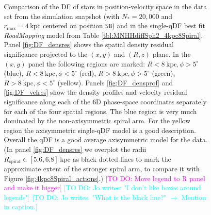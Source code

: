 \documentclass[iop,revtex4,numberedappendix,appendixfloats]{emulateapj}
\newcommand{\RM}{{\sl RoadMapping}}
\newcommand{\Wilma}[1]{\textcolor{Magenta}{#1}}
\newcommand{\Jo}[1]{\textcolor{Cyan}{#1}}
\begin{document}
\begin{figure}[!htbp]
  \caption{Comparison of the DF of stars in position-velocity space in the data set from the simulation snapshot (with $N_*=20,000$ and $r_\text{max}=4~\text{kpc}$ centered on position \texttt{S8}) and in the single-qDF best fit \RM{} model from Table \ref{tbl:MNHHdiffSph2_4kpc8Spiral}. Panel \ref{fig:DF_densres} shows the spatial density residual significance projected to the $(x,y)$ and $(R,z)$ plane. In the $(x,y)$ panel the following regions are marked: $R<8~\text{kpc},\phi>5^\circ$ (blue), $R<8~\text{kpc},\phi<5^\circ$ (red), $R>8~\text{kpc},\phi>5^\circ$ (green), $R>8~\text{kpc},\phi<5^\circ$ (yellow). Panels \ref{fig:DF_densprof} and \ref{fig:DF_velres} show the density profiles and velocity residual significance along each of the 6D phase-space coordinates separately for each of the four spatial regions. The blue region is very much dominated by the non-axisymmetric spiral arm. For the yellow region the axisymmetric single-qDF model is a good description. Overall the qDF is a good average axisymmetric model for the data. (In panel \ref{fig:DF_densres} we overplot the radii $R_\text{spiral} \in [5.6,6.8]~\text{kpc}$ as black dotted lines to mark the approximate extent of the stronger spiral arm, to compare it with Figure \ref{fig:4kpc8Spiral_actions}.) \Wilma{[TO DO: Move legend to R panel and make it bigger]} \Jo{[TO DO: Jo writes: "I don't like boxes around legends"]} \Jo{[TO DO: Jo writes: "What is the black line?" $\longrightarrow$ Mention in caption.]}}
  \label{fig:4kpc8Spiral_DF_comparison}
\end{figure}
\end{document}
